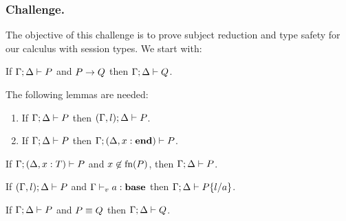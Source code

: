 \documentclass[runningheads]{llncs}
\begin{document}
\subsubsection{Challenge.}
The objective of this challenge is to prove subject reduction and type safety for our calculus with session types. We start with:
\begin{theorem}
  If \( \Gamma;\Delta \vdash P \) and \( P \rightarrow Q \) then \( \Gamma;\Delta \vdash Q \).
\end{theorem}

The following lemmas are needed:
\begin{lemma}[Weakening]\mbox{}
  \label{lemma:weak}
  \begin{enumerate}
  \item If \( \Gamma; \Delta \vdash P \) then
    \( (\Gamma, l);\Delta \vdash P \).
      \item If \( \Gamma; \Delta \vdash P \) %
        then
    \( \Gamma;(\Delta, x : \mathbf{end}) \vdash P \).
  \end{enumerate}

\end{lemma}

\begin{lemma}[Strengthening]\mbox{}
  \label{lemma:strenD}
  If \( \Gamma; (\Delta, x : T) \vdash P \) and $x\not\in \textrm{fn}(P)$, then \( \Gamma; \Delta \vdash P \).
\end{lemma}

\begin{lemma}[Substitution]\mbox{}
  If $(\Gamma, l);\Delta \vdash P$ and ${\Gamma \vdash_v a : \mathbf{base}}$ then
  \( \Gamma;\Delta \vdash P\{l/a\} \).
\end{lemma}

\begin{lemma}
  If \( \Gamma;\Delta \vdash P \) and \( P \equiv Q \) then \( \Gamma;\Delta \vdash Q \).
\end{lemma}
\end{document}
